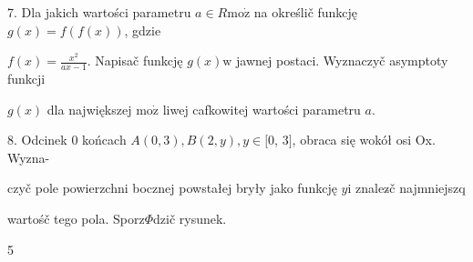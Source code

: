 \documentclass[a4paper,12pt]{article}
\begin{document}
7. Dla jakich wartości parametru $a\in R\mathrm{m}\mathrm{o}\dot{\mathrm{z}}$ na określič funkcję $g(x)=f(f(x))$, gdzie

$f(x)=\displaystyle \frac{x^{2}}{ax-1}$. Napisač funkcję $g(x)\mathrm{w}$ jawnej postaci. Wyznaczyč asymptoty funkcji

$g(x)$ dla największej $\mathrm{m}\mathrm{o}\dot{\mathrm{z}}$ liwej cafkowitej wartości parametru $a.$

8. Odcinek $0$ końcach $A(0,3), B(2,y), y \in [0$, 3$]$, obraca się wokół osi Ox. Wyzna-

czyč pole powierzchni bocznej powstałej bryły jako funkcję $y\mathrm{i}$ znalez$\acute{}$č najmniejszq

wartośč tego pola. Sporz$\Phi$dzič rysunek.

5
\end{document}
